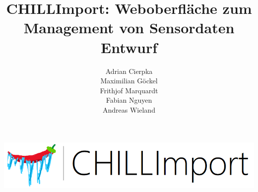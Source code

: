 \documentclass[a4paper, 12pt, titlepage]{article}
\author{
Adrian Cierpka \\
Maximilian Göckel \\
Frithjof Marquardt \\
Fabian Nguyen \\
Andreas Wieland
\vspace{3cm}}
\title{CHILLImport: Weboberfläche zum Management von Sensordaten\\\vspace{2cm}
\Large Entwurf\\\vspace{4cm}}
\begin{document}
\includegraphics[scale=1]{logo}
\maketitle
\clearpage
\tableofcontents
\clearpage
{} 


%

%





%
%


\end{document}
